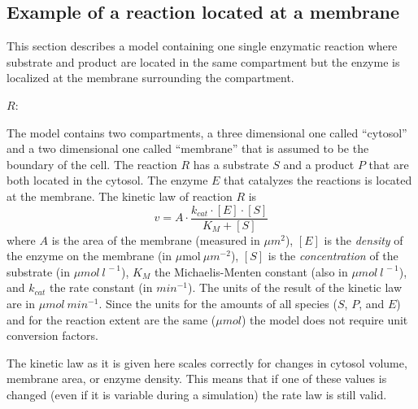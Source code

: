 

\subsection{Example of a reaction located at a membrane}
\label{sec:eg:membrane-reaction}

\label{sec:reaction-membrane-eg}This section describes a model containing
one single enzymatic reaction where substrate and product are located
in the same compartment but the enzyme is localized at the membrane
surrounding the compartment.

\begin{center}
$R$: 
\par\end{center}

The model contains two compartments, a three dimensional one
called {}``cytosol'' and a two dimensional one called
{}``membrane'' that is assumed to be the boundary of the cell. The
reaction $R$ has a substrate $S$ and a product $P$ that are both
located in the cytosol. The enzyme $E$ that catalyzes the
reactions is located at the membrane. The kinetic law of reaction
$R$ is\[ v=A\cdot\frac{k_{cat}\cdot[E]\cdot[S]}{K_{M}+[S]}\] where
$A$ is the area of the membrane (measured in $\mu m^{2}$), $[E]$
is the \emph{density }of the enzyme on the membrane (in
$\mu\mathrm{mol}~\mu m^{-2}$), $[S]$ is the \emph{concentration
}of the substrate (in $\mu mol~l^{\,-1}$), $K_{M}$ the
Michaelis-Menten constant (also in $\mu mol~l^{\,-1}$), and
$k_{cat}$ the rate constant (in $min^{-1}$). The units of the
result of the kinetic law are in $\mu mol~min^{-1}$. Since the
units for the amounts of all species ($S$, $P$, and $E$) and for
the reaction extent are the same ($\mu mol$) the model does not
require unit conversion factors.

The kinetic law as it is given here scales correctly for changes in
cytosol volume, membrane area, or enzyme density. This means that
if one of these values is changed (even if it is variable during a
simulation) the rate law is still valid.


